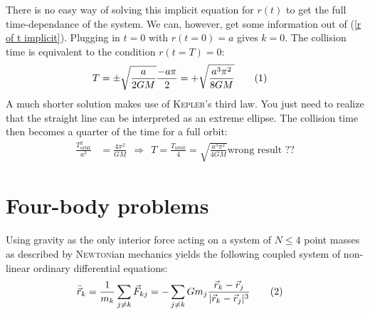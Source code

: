 \documentclass[a4paper,12pt]{article}
\newcommand\numberthis{\addtocounter{equation}{1}\tag{\theequation}}
\newcommand{\tecxt}{}
\begin{document}
There is no easy way of solving this implicit equation for $r(t)$ to get the full time-dependance of the system. We can, however, get some information out of (\ref{r of t implicit}). Plugging in $t=0$ with $r(t=0)=a$ gives $k=0$. The collision time is equivalent to the condition $r(t=T)=0$:
\begin{align*}
T&=\pm\sqrt{\frac{a}{2GM}}\frac{-a\pi}{2}=+\sqrt{\frac{a^3\pi^2}{8GM}}\numberthis\label{T collision time}
\end{align*}
A much shorter solution makes use of \textsc{Kepler}'s third law. You just need to realize that the straight line can be interpreted as an extreme ellipse. The collision time then becomes a quarter of the time for a full orbit:
\begin{align*}
\frac{T_\text{orbit}^2}{a^3}&=\frac{4\pi^2}{GM}\ \ \Rightarrow\ \ T=\frac{T_\tecxt\text{orbit}}{4}=\sqrt{\frac{a^3\pi^2}{4GM}}\tecxt\text{wrong result ??}
\end{align*} 

\section{Four-body problems}
Using gravity as the only interior force acting on a system of $N\le 4$ point masses as described by \textsc{Newton}ian mechanics yields the following coupled system of non-linear ordinary differential equations:
\begin{align*}
\ddot{\vec{r}}_k&=\frac{1}{m_k}\sum_{j\neq k}\vec{F}_{kj}=-\sum_{j\neq k}Gm_j\frac{\vec{r}_k-\vec{r}_j}{|\vec{r}_k-\vec{r}_j|^3}\numberthis\label{rk ddot general}
\end{align*}
\end{document}
